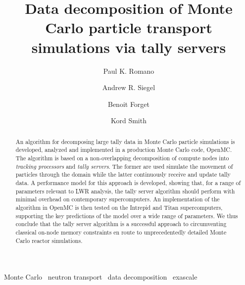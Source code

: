 \documentclass[3p]{elsarticle}
\begin{document}
\begin{frontmatter}

\title{Data decomposition of Monte Carlo particle transport simulations via
  tally servers}
\author[mit]{Paul K. Romano}

\author[anl]{Andrew R. Siegel}

\author[mit]{Benoit Forget}

\author[mit]{Kord Smith}

\address[mit]{Massachusetts Institute of Technology, Department of Nuclear
  Science and Engineering, 77 Massachusetts Avenue, Building 24-213, Cambridge,
  MA 02141}

\address[anl]{Argonne National Laboratory, Mathematics and Computer Science
  Division}

\begin{abstract}
An algorithm for decomposing large tally data in Monte Carlo particle
simulations is developed, analyzed and implemented in a production Monte Carlo
code, OpenMC. The algorithm is based on a non-overlapping decomposition of
compute nodes into {\em tracking processors} and {\em tally servers}. The former
are used simulate the movement of particles through the domain while the latter
continuously receive and update tally data. A performance model for this
approach is developed, showing that, for a range of parameters relevant to LWR
analysis, the tally server algorithm should perform with minimal overhead on
contemporary supercomputers. An implementation of the algorithm in OpenMC is
then tested on the Intrepid and Titan supercomputers, supporting the key
predictions of the model over a wide range of parameters. We thus conclude that
the tally server algorithm is a successful approach to circumventing classical
on-node memory constraints en route to unprecedentedly detailed Monte Carlo
reactor simulations.
\end{abstract}

\begin{keyword}
  Monte Carlo \ neutron transport \ data decomposition \ exascale
\end{keyword}

\end{frontmatter}

\end{document}
